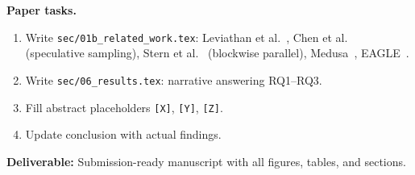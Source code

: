 \smallskip\noindent\textbf{Paper tasks.}
\begin{enumerate}\itemsep0pt
    \item Write \texttt{sec/01b\_related\_work.tex}: Leviathan et al.~\cite{Leviathan2023}, Chen et al.~\cite{Chen2023specsampling} (speculative sampling), Stern et al.~\cite{Stern2018blockwise} (blockwise parallel), Medusa~\cite{Cai2024Medusa}, EAGLE~\cite{Li2024Eagle,Li2024Eagle2}.
    \item Write \texttt{sec/06\_results.tex}: narrative answering RQ1--RQ3.
    \item Fill abstract placeholders \texttt{[X]}, \texttt{[Y]}, \texttt{[Z]}.
    \item Update conclusion with actual findings.
\end{enumerate}

\noindent\textbf{Deliverable:} Submission-ready manuscript with all figures, tables, and sections.
